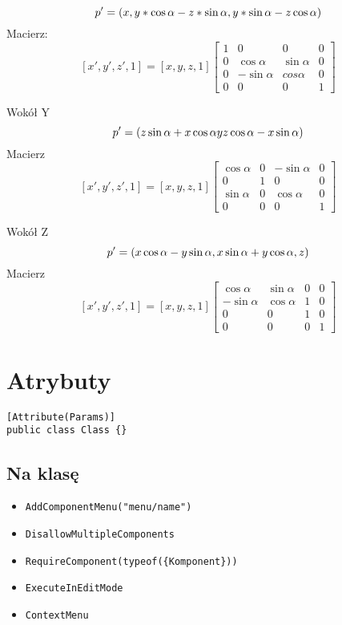 \documentclass{article}
\begin{document}
$$
p' = (x,\\
 y* \cos\alpha - z * \sin\alpha,\\
 y*\sin\alpha - z\cos\alpha)
$$
Macierz: 
$$
[x', y', z', 1] = [x,y,z,1]
\begin{bmatrix}
    1 &0&0&0\\
    0&\cos\alpha&\sin\alpha&0\\
    0&-\sin\alpha&cos\alpha&0\\
    0&0&0&1
\end{bmatrix}
$$

Wokół Y
$$
p' = (z\sin\alpha + x\cos\alpha\\
y\\
z\cos\alpha - x\sin\alpha)
$$
Macierz
$$
[x', y', z', 1] = [x,y,z,1]
\begin{bmatrix}
    \cos\alpha&0&-\sin\alpha&0\\
    0&1&0&0\\
    \sin\alpha&0&\cos\alpha&0\\
    0&0&0&1
\end{bmatrix}
$$

Wokół Z
$$
p' = (x\cos\alpha - y\sin\alpha,\\
x\sin\alpha + y\cos\alpha,\\
z)
$$
Macierz
$$
[x', y', z', 1] = [x,y,z,1]
\begin{bmatrix}
    \cos\alpha&\sin\alpha &0&0\\
    -\sin\alpha & \cos\alpha &1 &0\\
    0&0&1&0\\
    0&0&0&1
\end{bmatrix}
$$

\newpage
\section{Atrybuty}
\begin{lstlisting}
[Attribute(Params)]
public class Class {}
\end{lstlisting}
\subsection{Na klasę}

\begin{itemize}
    \item \verb`AddComponentMenu("menu/name")`
    \item \verb`DisallowMultipleComponents`
    \item \verb`RequireComponent(typeof({Komponent}))`
    \item \verb`ExecuteInEditMode`
    \item \verb`ContextMenu`
\end{itemize}
\end{document}
